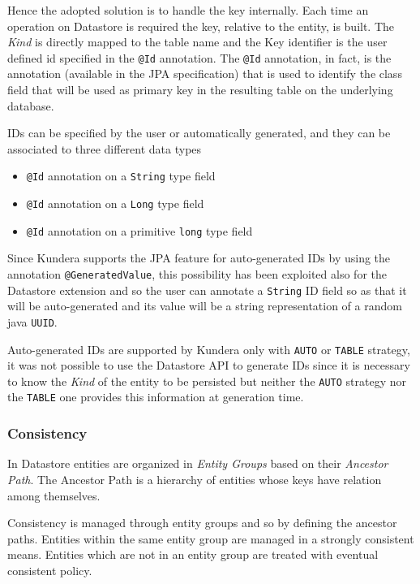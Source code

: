 \noindent Hence the adopted solution is to handle the key internally. Each time an operation on Datastore is required the key, relative to the entity, is built. The \textit{Kind} is directly mapped to the table name and the Key identifier is the user defined id specified in the \texttt{@Id} annotation.
The \texttt{@Id} annotation, in fact, is the annotation (available in the JPA specification) that is used to identify the class field that will be used as primary key in the resulting table on the underlying database.

\newparagraph IDs can be specified by the user or automatically generated, and they can be associated to three different data types
\begin{itemize}
\item \texttt{@Id} annotation on a \texttt{String} type field
\item \texttt{@Id} annotation on a \texttt{Long} type field
\item \texttt{@Id} annotation on a primitive \texttt{long} type field
\end{itemize}

\noindent Since Kundera supports the JPA feature for auto-generated IDs by using the annotation \texttt{@GeneratedValue}, this possibility has been exploited also for the Datastore extension and so the user can annotate a \texttt{String} ID field so as that it will be auto-generated and its value will be a string representation of a random java \texttt{UUID}.

\noindent Auto-generated IDs are supported by Kundera only with \texttt{AUTO} or \texttt{TABLE} strategy, it was not possible to use the Datastore API to generate IDs since it is necessary to know the \textit{Kind} of the entity to be persisted but neither the \texttt{AUTO} strategy nor the \texttt{TABLE} one provides this information at generation time.

\subsubsection{Consistency}
In Datastore entities are organized in \textit{Entity Groups} based on their \textit{Ancestor Path}. The Ancestor Path is a hierarchy of entities whose keys have relation among themselves.

\noindent Consistency is managed through entity groups and so by defining the ancestor paths. Entities within the same entity group are managed in a strongly consistent means. Entities which are not in an entity group are treated with eventual consistent policy.

